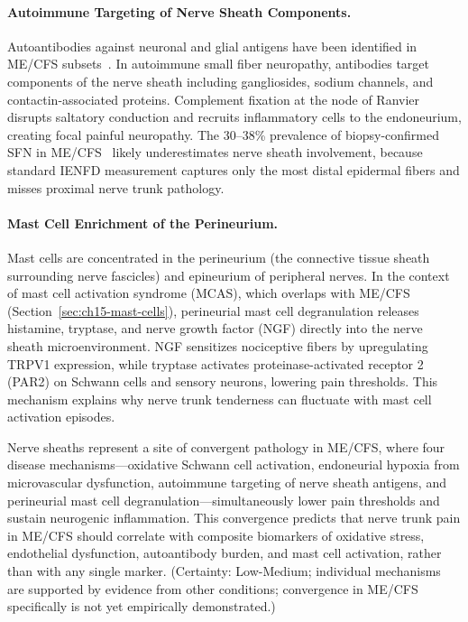 \paragraph{Autoimmune Targeting of Nerve Sheath Components.}
Autoantibodies against neuronal and glial antigens have been identified in ME/CFS subsets~\cite{Oaklander2016autoimmuneSFN}. In autoimmune small fiber neuropathy, antibodies target components of the nerve sheath including gangliosides, sodium channels, and contactin-associated proteins. Complement fixation at the node of Ranvier disrupts saltatory conduction and recruits inflammatory cells to the endoneurium, creating focal painful neuropathy. The 30--38\% prevalence of biopsy-confirmed SFN in ME/CFS~\cite{Oaklander2022SFN} likely underestimates nerve sheath involvement, because standard IENFD measurement captures only the most distal epidermal fibers and misses proximal nerve trunk pathology.

\paragraph{Mast Cell Enrichment of the Perineurium.}
Mast cells are concentrated in the perineurium (the connective tissue sheath surrounding nerve fascicles) and epineurium of peripheral nerves. In the context of mast cell activation syndrome (MCAS), which overlaps with ME/CFS (Section~\ref{sec:ch15-mast-cells}), perineurial mast cell degranulation releases histamine, tryptase, and nerve growth factor (NGF) directly into the nerve sheath microenvironment. NGF sensitizes nociceptive fibers by upregulating TRPV1 expression, while tryptase activates proteinase-activated receptor 2 (PAR2) on Schwann cells and sensory neurons, lowering pain thresholds. This mechanism explains why nerve trunk tenderness can fluctuate with mast cell activation episodes.

\begin{hypothesis}
\label{hyp:ch15-nerve-sheath-vulnerability}
Nerve sheaths represent a site of convergent pathology in ME/CFS, where four disease mechanisms---oxidative Schwann cell activation, endoneurial hypoxia from microvascular dysfunction, autoimmune targeting of nerve sheath antigens, and perineurial mast cell degranulation---simultaneously lower pain thresholds and sustain neurogenic inflammation. This convergence predicts that nerve trunk pain in ME/CFS should correlate with composite biomarkers of oxidative stress, endothelial dysfunction, autoantibody burden, and mast cell activation, rather than with any single marker. (Certainty: Low-Medium; individual mechanisms are supported by evidence from other conditions; convergence in ME/CFS specifically is not yet empirically demonstrated.)
\end{hypothesis}

